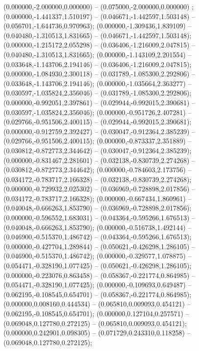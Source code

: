  (0.000000,-2.000000,0.000000) -- (0.075000,-2.000000,0.000000) ;
 (0.000000,-1.441337,1.510197) -- (0.046671,-1.442597,1.503148) -- (0.056701,-1.644736,0.970963);
 (0.000000,-1.309436,1.839109) -- (0.040480,-1.310513,1.831665) -- (0.046671,-1.442597,1.503148);
 (0.000000,-1.215172,2.055298) -- (0.036406,-1.216009,2.047815) -- (0.040480,-1.310513,1.831665);
 (0.000000,-1.143109,2.201554) -- (0.033648,-1.143706,2.194146) -- (0.036406,-1.216009,2.047815);
 (0.000000,-1.084930,2.300118) -- (0.031789,-1.085300,2.292806) -- (0.033648,-1.143706,2.194146);
 (0.000000,-1.035664,2.363277) -- (0.030597,-1.035824,2.356046) -- (0.031789,-1.085300,2.292806);
 (0.000000,-0.992051,2.397861) -- (0.029944,-0.992015,2.390681) -- (0.030597,-1.035824,2.356046);
 (0.000000,-0.951726,2.407281) -- (0.029766,-0.951506,2.400115) -- (0.029944,-0.992015,2.390681);
 (0.000000,-0.912759,2.392427) -- (0.030047,-0.912364,2.385239) -- (0.029766,-0.951506,2.400115);
 (0.000000,-0.873337,2.351889) -- (0.030812,-0.872773,2.344642) -- (0.030047,-0.912364,2.385239);
 (0.000000,-0.831467,2.281601) -- (0.032138,-0.830739,2.274268) -- (0.030812,-0.872773,2.344642);
 (0.000000,-0.784603,2.173756) -- (0.034172,-0.783717,2.166328) -- (0.032138,-0.830739,2.274268);
 (0.000000,-0.729932,2.025302) -- (0.036969,-0.728898,2.017856) -- (0.034172,-0.783717,2.166328);
 (0.000000,-0.667434,1.860961) -- (0.040048,-0.666263,1.853790) -- (0.036969,-0.728898,2.017856);
 (0.000000,-0.596552,1.683031) -- (0.043364,-0.595266,1.676513) -- (0.040048,-0.666263,1.853790);
 (0.000000,-0.516738,1.492144) -- (0.046900,-0.515370,1.486742) -- (0.043364,-0.595266,1.676513);
 (0.000000,-0.427704,1.289844) -- (0.050621,-0.426298,1.286105) -- (0.046900,-0.515370,1.486742);
 (0.000000,-0.329577,1.078875) -- (0.054471,-0.328190,1.077425) -- (0.050621,-0.426298,1.286105);
 (0.000000,-0.223076,0.863458) -- (0.058367,-0.221774,0.864985) -- (0.054471,-0.328190,1.077425);
 (0.000000,-0.109693,0.649487) -- (0.062195,-0.108545,0.654701) -- (0.058367,-0.221774,0.864985);
 (0.000000,0.008160,0.444534) -- (0.065810,0.009093,0.454121) -- (0.062195,-0.108545,0.654701);
 (0.000000,0.127104,0.257571) -- (0.069048,0.127780,0.272125) -- (0.065810,0.009093,0.454121);
 (0.000000,0.242901,0.098305) -- (0.071729,0.243310,0.118258) -- (0.069048,0.127780,0.272125);
